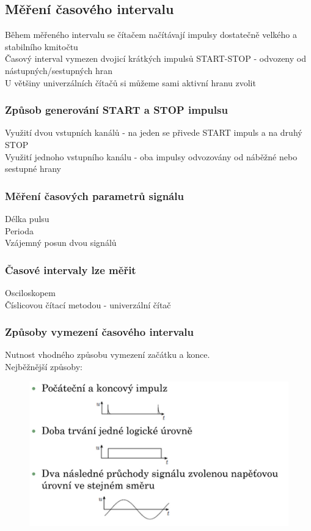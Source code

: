 \subsection*{Měření časového intervalu}
Během měřeného intervalu se čítačem načítávají impulsy dostatečně velkého a stabilního kmitočtu\\
Časový interval vymezen dvojicí krátkých impulsů START-STOP - odvozeny od nástupných/sestupných hran\\
U většiny univerzálních čítačů si můžeme sami aktivní hranu zvolit\\

\subsubsection*{Způsob generování START a STOP impulsu}
Využití dvou vstupních kanálů - na jeden se přivede START impuls a na druhý STOP\\
Využití jednoho vstupního kanálu - oba impulsy odvozovány od náběžné nebo sestupné hrany 

\subsubsection*{Měření časových parametrů signálu}
Délka pulsu\\
Perioda\\
Vzájemný posun dvou signálů\\

\subsubsection*{Časové intervaly lze měřit}
Osciloskopem\\
Číslicovou čítací metodou - univerzální čítač\\
\newpage

\subsubsection*{Způsoby vymezení časového intervalu}
Nutnost vhodného způsobu vymezení začátku a konce.\\
Nejběžnější způsoby:
\begin{figure}[H]
    \includegraphics*[scale = 1]{images/vymezeniCasovehoIntervalu.png}
\end{figure}


